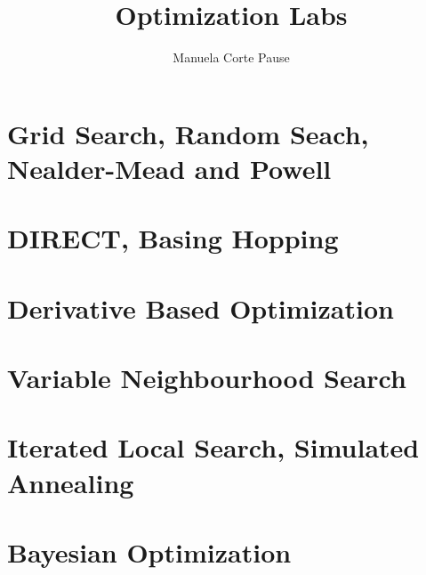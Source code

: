 \documentclass{article}
\title{Optimization Labs}
\author{Manuela Corte Pause}
\begin{document}
\maketitle

\tableofcontents
\newpage

\section{Grid Search, Random Seach, Nealder-Mead and Powell}

\newpage

\section{DIRECT, Basing Hopping}

\newpage

\section{Derivative Based Optimization}

\newpage

\section{Variable Neighbourhood Search}

\newpage

\section{Iterated Local Search, Simulated Annealing}

\newpage

\section{Bayesian Optimization}

\newpage
\end{document}
